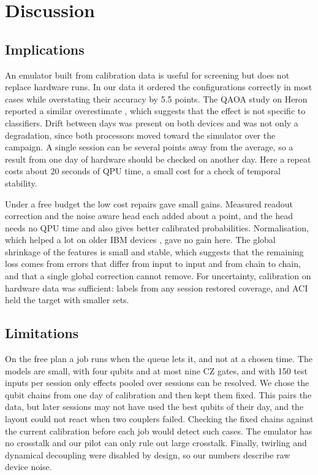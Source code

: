 \documentclass[10pt,conference]{IEEEtran}
\begin{document}
\section{Discussion}

\subsection{Implications}
An emulator built from calibration data is useful for screening but does not replace hardware runs. In our data it ordered the configurations correctly in most cases while overstating their
accuracy by 5.5 points. The QAOA
study on Heron reported a similar overestimate \cite{qaoa2026drift}, which suggests that the effect is not specific
to classifiers. Drift between days was present on both devices and was not only a degradation, since both
processors moved toward the simulator over the campaign. A single session can be several
points away from the average, so a result from one day of hardware should be checked on another
day. Here a repeat costs about 20 seconds of QPU time, a small cost for a check of temporal stability.

Under a free budget the low cost repairs gave small gains. Measured readout correction and the noise
aware head each added about a point, and the head needs no QPU time and also gives better calibrated probabilities. Normalisation, which helped a lot on older IBM devices
\cite{wang2022quantumnat}, gave no gain here. The global shrinkage of the features is small and
stable, which suggests that the remaining loss comes from errors that differ from input to input and from
chain to chain, and that a single global correction cannot remove. For uncertainty, calibration on hardware data
was sufficient: labels from any session restored coverage, and ACI held the target
with smaller sets.

\subsection{Limitations}
On the free plan a job runs when the queue lets it, and not at a chosen time. The models are small, with
four qubits and at most nine CZ gates, and with 150 test inputs per session only effects pooled
over sessions can be resolved. We chose the qubit chains from one day of calibration and then kept
them fixed. This pairs the data, but later sessions may not have used the best qubits of
their day, and the layout could not react when two couplers failed. Checking the fixed chains against the current calibration before each job would detect such
cases. The emulator has no
crosstalk and our pilot can only rule out large crosstalk. Finally, twirling and dynamical decoupling were disabled by design, so our numbers describe raw device noise.
\end{document}
